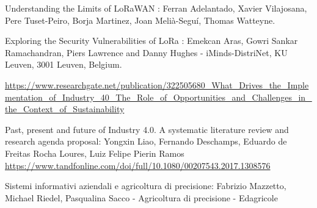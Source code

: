 \documentclass[12pt,a4paper,openright,twoside]{report}
\begin{document}
\begin{thebibliography}{90}
 Understanding the Limits of LoRaWAN : Ferran Adelantado, Xavier Vilajosana, Pere Tuset-Peiro, Borja Martinez, Joan Melià-Seguí, Thomas Watteyne.

 Exploring the Security Vulnerabilities of LoRa :  Emekcan Aras, Gowri Sankar Ramachandran, Piers Lawrence and Danny Hughes - iMinds-DistriNet, KU Leuven, 3001 Leuven, Belgium.

 \hyperref[industry4]{https://www.researchgate.net/publication/322505680\_What\_Drives\_the\_Implementation\_of\_Industry\_40\_The\_Role\_of\_Opportunities\_and\_Challenges\_in\_the\_Context\_of\_Sustainability}

 Past, present and future of Industry 4.0. A systematic literature review and research agenda proposal: Yongxin Liao, Fernando Deschamps, Eduardo de Freitas Rocha Loures, Luiz Felipe Pierin Ramos
\hyperref[industry4]{https://www.tandfonline.com/doi/full/10.1080/00207543.2017.1308576}

 Sistemi informativi aziendali e agricoltura di precisione: Fabrizio Mazzetto, Michael Riedel, Pasqualina Sacco - Agricoltura di precisione - Edagricole  



\end{thebibliography}
\end{document}
